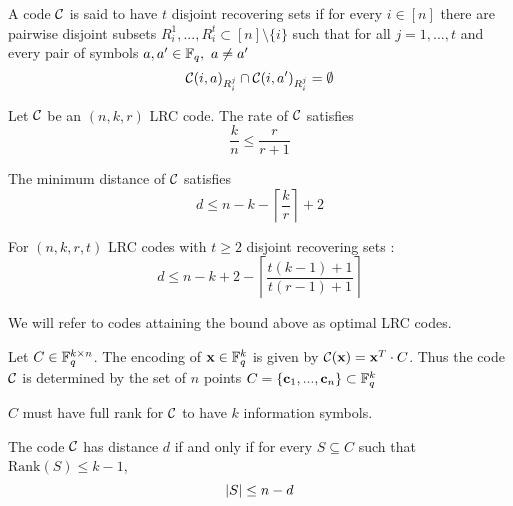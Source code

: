\begin{defn}
A code ${\mathcal C}$ is said to have $t$ disjoint recovering sets if for every $i \in [n]$ there are pairwise disjoint subsets $R_i^1, ..., R_i^t \subset [n] \setminus \{i\}$ such that for all $j =1, ..., t$ and every pair of symbols $a,a' \in {\mathbb F}_q, \ a \neq a'$
\begin{equation}
{\mathcal C}(i,a)_{R_i^j} \cap {\mathcal C}(i,a')_{R_i^j} = \emptyset
\end{equation}

\end{defn}

Let ${\mathcal C}$ be an $(n,k,r)$ LRC code. The rate of ${\mathcal C}$ satisfies
\begin{equation}
    \frac{k}{n} \leq \frac{r}{r+1}
\end{equation}

The minimum distance of ${\mathcal C}$ satisfies \cite{GHSY12}
\begin{equation}
d \leq n -k - \left\lceil \frac{k}{r} \right\rceil + 2
\end{equation}

For $(n,k,r,t)$ LRC codes with $t \geq 2$ disjoint recovering sets \cite{RPDV16}:
\begin{equation}
    d \leq n-k + 2 - \left\lceil \frac{t(k-1)+1}{t(r-1)+1} \right\rceil
\end{equation}


We will refer to codes attaining the bound above as optimal LRC codes.

Let $C \in {\mathbb F}_q^{k \times n}$. The encoding of $\mathbf{x} \in {\mathbb F}_q^k$ is given by ${\mathcal C}(\mathbf{x}) = \mathbf{x}^T \cdot C$. Thus the code ${\mathcal C}$ is determined by the set of $n$ points $C = \{ \mathbf{c}_1, ... , \mathbf{c}_n \} \subset {\mathbb F}_q^k$

$C$ must have full rank for ${\mathcal C}$ to have $k$ information symbols.

The code ${\mathcal C}$ has distance $d$ if and only if for every $S \subseteq C$ such that $\mbox{Rank}(S) \leq k-1$, 
\begin{equation}
\left\vert {S} \right\vert \leq n-d
\end{equation}